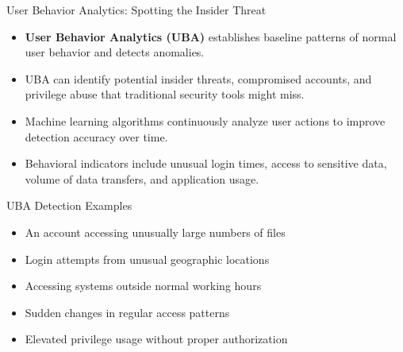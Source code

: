 \documentclass{beamer}
\begin{document}
                        \begin{frame}{User Behavior Analytics: Spotting the Insider Threat}
                        \begin{itemize}
                            \item \textbf{User Behavior Analytics (UBA)} establishes baseline patterns of normal user behavior and detects anomalies.
                            \item UBA can identify potential insider threats, compromised accounts, and privilege abuse that traditional security tools might miss.
                            \item Machine learning algorithms continuously analyze user actions to improve detection accuracy over time.
                            \item Behavioral indicators include unusual login times, access to sensitive data, volume of data transfers, and application usage.
                        \end{itemize}
                        
                        \begin{block}{UBA Detection Examples}
                        \begin{itemize}
                            \item An account accessing unusually large numbers of files
                            \item Login attempts from unusual geographic locations
                            \item Accessing systems outside normal working hours
                            \item Sudden changes in regular access patterns
                            \item Elevated privilege usage without proper authorization
                        \end{itemize}
                        \end{block}
                        \end{frame}
\end{document}

